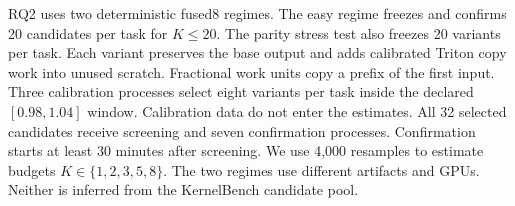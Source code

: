 RQ2 uses two deterministic fused8 regimes. The easy regime freezes and confirms
20 candidates per task for $K\leq20$. The parity stress test also freezes 20
variants per task. Each variant preserves the base output and adds calibrated
Triton copy work into unused scratch. Fractional work units copy a prefix of the
first input. Three calibration processes select eight variants per task inside
the declared $[0.98,1.04]$ window. Calibration data do not enter the estimates.
All 32 selected candidates receive screening and seven confirmation processes.
Confirmation starts at least 30 minutes after screening. We use 4,000 resamples
to estimate budgets $K\in\{1,2,3,5,8\}$. The two regimes use different artifacts
and GPUs. Neither is inferred from the KernelBench candidate pool.
